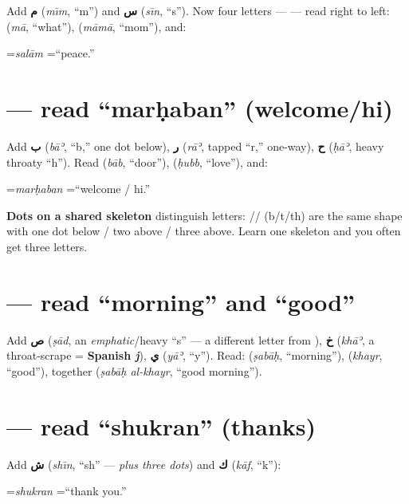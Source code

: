 Add \textbf{م} (\emph{m\=\i m}, ``m'') and \textbf{س} (\emph{s\=\i n}, ``s'').
Now four letters ---  --- read right to left:
 (\emph{m\=a}, ``what''),  (\emph{m\=am\=a}, ``mom''), and:
\begin{center} \quad=\quad \emph{sal\=am} \quad=\quad ``peace.''\end{center}

\section{ --- read ``mar\d{h}aban'' (welcome/hi)}
\label{lesson:read-marhaba}

Add \textbf{ب} (\emph{b\=aʾ}, ``b,'' one dot below), \textbf{ر} (\emph{r\=aʾ},
tapped ``r,'' one-way), \textbf{ح} (\emph{\d{h}\=aʾ}, heavy throaty ``h'').
Read  (\emph{b\=ab}, ``door''),  (\emph{\d{h}ubb}, ``love''),
and:
\begin{center} \quad=\quad \emph{mar\d{h}aban} \quad=\quad ``welcome / hi.''\end{center}

\begin{cousinweb}
\textbf{Dots on a shared skeleton} distinguish letters: //
(b/t/th) are the same shape with one dot below / two above / three above.
Learn one skeleton and you often get three letters.
\end{cousinweb}

\section{ --- read ``morning'' and ``good''}
\label{lesson:read-sabah}

Add \textbf{ص} (\emph{\d{s}\=ad}, an \emph{emphatic}/heavy ``s'' --- a
different letter from ), \textbf{خ} (\emph{kh\=aʾ}, a throat-scrape =
\textbf{Spanish \emph{j}}), \textbf{ي} (\emph{y\=aʾ}, ``y''). Read:
 (\emph{\d{s}ab\=a\d{h}}, ``morning''),  (\emph{khayr},
``good''), together  (\emph{\d{s}ab\=a\d{h} al-khayr}, ``good
morning'').

\section{ --- read ``shukran'' (thanks)}
\label{lesson:read-shukran}

Add \textbf{ش} (\emph{sh\=\i n}, ``sh'' ---  \emph{plus three dots}) and
\textbf{ك} (\emph{k\=af}, ``k''):
\begin{center} \quad=\quad \emph{shukran} \quad=\quad ``thank you.''\end{center}

